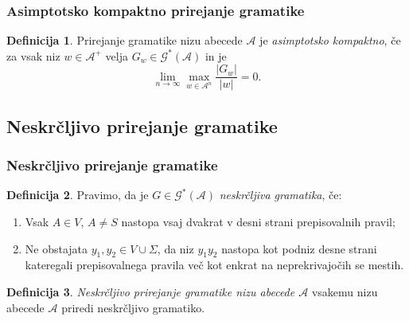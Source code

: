 \documentclass{beamer}
\theoremstyle{definition}
\newtheorem{definicija}{Definicija}[section]
\providecommand{\abs}[1]{\left\lvert #1 \right\rvert}
\newcommand{\A}{\mathcal{A}}
\newcommand{\G}{\mathcal{G}}
\begin{document}
\begin{frame}
    \frametitle{Asimptotsko kompaktno prirejanje gramatike}
    \begin{definicija}
        Prirejanje gramatike nizu abecede $\A$ je \textit{asimptotsko kompaktno}, če za vsak niz
        $w \in \A^+$ velja $G_w \in \G^*(\A)$ in je
        \[
            \lim_{n \rightarrow \infty} \max_{w \in \A^n} \frac{\abs{G_w}}{\abs{w}} = 0.
        \]
    \end{definicija}
\end{frame}

\subsection{Neskrčljivo prirejanje gramatike}

\begin{frame}
    \frametitle{Neskrčljivo prirejanje gramatike}
    \begin{definicija}
        Pravimo, da je $G \in \G^*(\A)$ \emph{neskrčljiva gramatika}, če:
        \begin{enumerate}
            \item Vsak $A \in V$, $A \neq S$ nastopa vsaj dvakrat v desni strani prepisovalnih pravil;
            \item Ne obstajata $y_1,y_2 \in V \cup \Sigma$, da niz $y_1y_2$ nastopa kot podniz desne 
            strani kateregali prepisovalnega pravila več kot enkrat na neprekrivajočih se mestih. 
        \end{enumerate}
    \end{definicija}
    \pause
    \begin{definicija}
        \emph{Neskrčljivo prirejanje gramatike nizu abecede $\A$} vsakemu nizu abecede $\A$ priredi
        neskrčljivo gramatiko.
    \end{definicija}
\end{frame}
\end{document}
